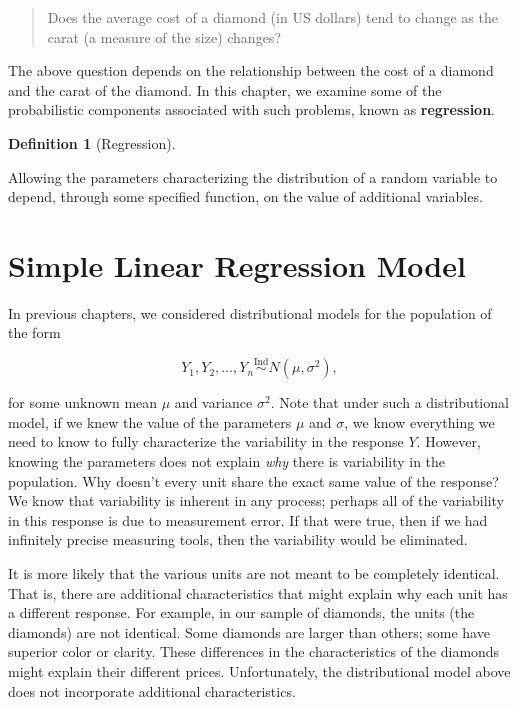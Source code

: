 \documentclass[
  letterpaper,
  DIV=11,
  numbers=noendperiod]{scrreprt}
\theoremstyle{definition}
\newtheorem{definition}{Definition}[chapter]
\theoremstyle{plain}
\theoremstyle{definition}
\theoremstyle{remark}
\begin{document}
\begin{quote}
Does the average cost of a diamond (in US dollars) tend to change as the
carat (a measure of the size) changes?
\end{quote}

The above question depends on the relationship between the cost of a
diamond and the carat of the diamond. In this chapter, we examine some
of the probabilistic components associated with such problems, known as
\textbf{regression}.

\begin{definition}[Regression]\protect\hypertarget{def-regression}{}\label{def-regression}

Allowing the parameters characterizing the distribution of a random
variable to depend, through some specified function, on the value of
additional variables.

\end{definition}

\section{Simple Linear Regression
Model}\label{simple-linear-regression-model}

In previous chapters, we considered distributional models for the
population of the form

\[Y_1, Y_2, \dotsc, Y_n \stackrel{\text{Ind}}{\sim} N\left(\mu, \sigma^2\right),\]

for some unknown mean \(\mu\) and variance \(\sigma^2\). Note that under
such a distributional model, if we knew the value of the parameters
\(\mu\) and \(\sigma\), we know everything we need to know to fully
characterize the variability in the response \(Y\). However, knowing the
parameters does not explain \emph{why} there is variability in the
population. Why doesn't every unit share the exact same value of the
response? We know that variability is inherent in any process; perhaps
all of the variability in this response is due to measurement error. If
that were true, then if we had infinitely precise measuring tools, then
the variability would be eliminated.

It is more likely that the various units are not meant to be completely
identical. That is, there are additional characteristics that might
explain why each unit has a different response. For example, in our
sample of diamonds, the units (the diamonds) are not identical. Some
diamonds are larger than others; some have superior color or clarity.
These differences in the characteristics of the diamonds might explain
their different prices. Unfortunately, the distributional model above
does not incorporate additional characteristics.
\end{document}
